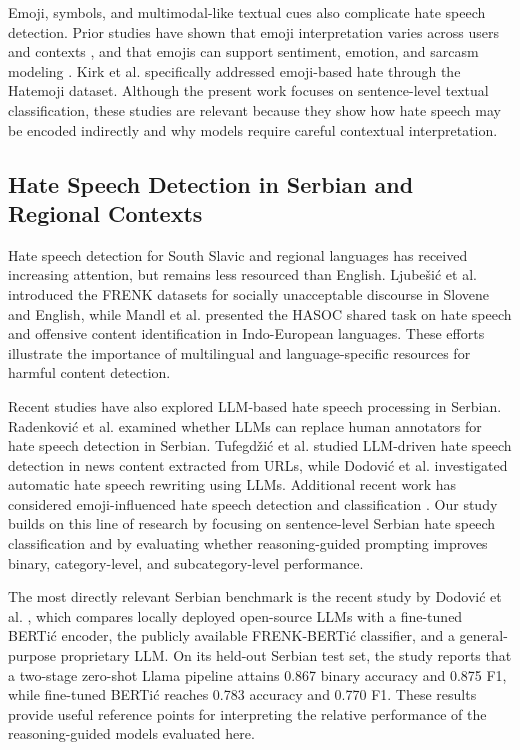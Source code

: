 \documentclass[a4paper]{article}
\begin{document}
Emoji, symbols, and multimodal-like textual cues also complicate hate speech detection. Prior studies have shown that emoji interpretation varies across users and contexts \cite{miller2016blissfully}, and that emojis can support sentiment, emotion, and sarcasm modeling \cite{felbo2017using,shoeb2020emotag1200}. Kirk et al. \cite{kirk2022hatemoji} specifically addressed emoji-based hate through the Hatemoji dataset. Although the present work focuses on sentence-level textual classification, these studies are relevant because they show how hate speech may be encoded indirectly and why models require careful contextual interpretation.

\subsection{Hate Speech Detection in Serbian and Regional Contexts}

Hate speech detection for South Slavic and regional languages has received increasing attention, but remains less resourced than English. Ljubešić et al. \cite{ljubesic2019frenk} introduced the FRENK datasets for socially unacceptable discourse in Slovene and English, while Mandl et al. \cite{mandl2019hasoc} presented the HASOC shared task on hate speech and offensive content identification in Indo-European languages. These efforts illustrate the importance of multilingual and language-specific resources for harmful content detection.

Recent studies have also explored LLM-based hate speech processing in Serbian. Radenković et al. \cite{radenkovic2025large} examined whether LLMs can replace human annotators for hate speech detection in Serbian. Tufegdžić et al. \cite{tufegdzic2025llm} studied LLM-driven hate speech detection in news content extracted from URLs, while Dodović et al. \cite{dodovic2025toxic} investigated automatic hate speech rewriting using LLMs. Additional recent work has considered emoji-influenced hate speech detection and classification \cite{tufegdzic2026twostage,dodovic2026comparative,tufegdzic2026impact,dodovic2026emojis}. Our study builds on this line of research by focusing on sentence-level Serbian hate speech classification and by evaluating whether reasoning-guided prompting improves binary, category-level, and subcategory-level performance.

The most directly relevant Serbian benchmark is the recent study by Dodović et al. \cite{dodovic2026access}, which compares locally deployed open-source LLMs with a fine-tuned BERTić encoder, the publicly available FRENK-BERTić classifier, and a general-purpose proprietary LLM. On its held-out Serbian test set, the study reports that a two-stage zero-shot Llama pipeline attains 0.867 binary accuracy and 0.875 F1, while fine-tuned BERTić reaches 0.783 accuracy and 0.770 F1. These results provide useful reference points for interpreting the relative performance of the reasoning-guided models evaluated here.
\end{document}
